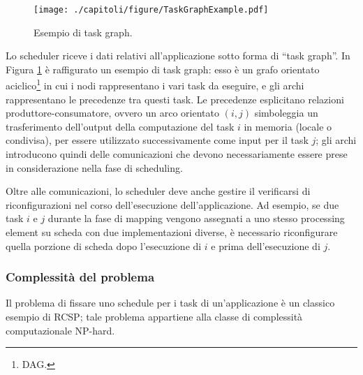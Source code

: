 \begin{figure}[ht]
 \begin{center}
 \texttt{[image: ./capitoli/figure/TaskGraphExample.pdf]}
 \caption{Esempio di task graph.}
 \label{fig:taskGraphExample}
 \end{center}
\end{figure}

Lo scheduler riceve i dati relativi all'applicazione sotto forma di ``task graph''.
In Figura \ref{fig:taskGraphExample} è raffigurato un esempio di task graph: esso è un 
grafo orientato aciclico\footnote{\ac{DAG}.} in cui i nodi rappresentano i vari task da 
eseguire, e gli archi rappresentano le precedenze tra questi task.
Le precedenze esplicitano relazioni produttore-consumatore, ovvero un arco orientato 
$(i,j)$ simboleggia un trasferimento dell'output della computazione del task $i$ in 
memoria (locale o condivisa), per essere utilizzato successivamente come input per il 
task $j$; gli archi introducono quindi delle comunicazioni che devono necessariamente 
essere prese in considerazione nella fase di scheduling.

Oltre alle comunicazioni, lo scheduler deve anche gestire il verificarsi di 
riconfigurazioni nel corso dell'esecuzione dell'applicazione. Ad esempio, se due task $i$ 
e $j$ durante la fase di mapping vengono assegnati a uno stesso processing element su 
scheda con due implementazioni diverse, è necessario riconfigurare quella porzione di 
scheda dopo l'esecuzione di $i$ e prima dell'esecuzione di $j$.


\subsubsection{Complessità del problema}
Il problema di fissare uno schedule per i task di un'applicazione è un classico esempio 
di \ac{RCSP}; tale problema appartiene alla classe di complessità computazionale 
NP-hard.


